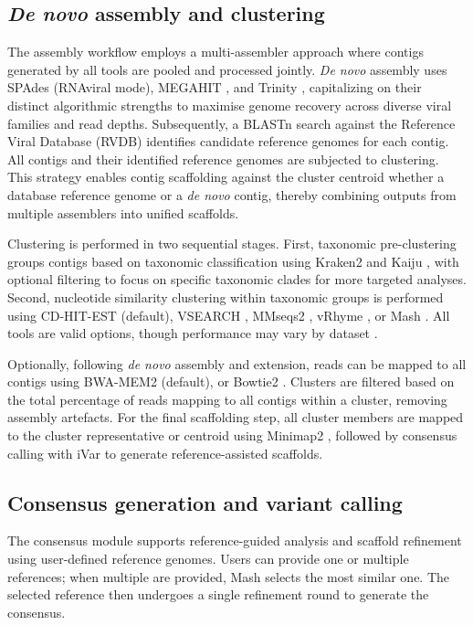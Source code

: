 \subsection{\textmd{\textit{De novo}} assembly and clustering}
The assembly workflow employs a multi-assembler approach where contigs generated by all tools are pooled and processed jointly. \textit{De novo} assembly uses SPAdes \citep{Meleshko2021-gb} (RNAviral mode), MEGAHIT \citep{Li2016-sd}, and Trinity \citep{Grabherr2011-ef}, capitalizing on their distinct algorithmic strengths to maximise genome recovery across diverse viral families and read depths. Subsequently, a BLASTn \citep{Altschul1990-sy} search against the Reference Viral Database (RVDB) \citep{Chin2025-fd} identifies candidate reference genomes for each contig. All contigs and their identified reference genomes are subjected to clustering. This strategy enables contig scaffolding against the cluster centroid whether a database reference genome or a \textit{de novo} contig, thereby combining outputs from multiple assemblers into unified scaffolds.

Clustering is performed in two sequential stages. First, taxonomic pre-clustering groups contigs based on taxonomic classification using Kraken2 \citep{Wood2019-jl} and Kaiju \citep{Menzel2016-tz}, with optional filtering to focus on specific taxonomic clades for more targeted analyses. Second, nucleotide similarity clustering within taxonomic groups is performed using CD-HIT-EST \citep{Li2006-nj} (default), VSEARCH \citep{Rognes2016-ju}, MMseqs2 \citep{Steinegger2017-ci}, vRhyme \citep{Kieft2022-km}, or Mash \citep{Ondov2019-bo}. All tools are valid options, though performance may vary by dataset \citep{Zielezinski2025-vl,Steinegger2017-ci}.

Optionally, following \textit{de novo} assembly and extension, reads can be mapped to all contigs using BWA-MEM2 \citep{Vasimuddin2019-rb} (default), or Bowtie2 \citep{Langmead2019-wx}. Clusters are filtered based on the total percentage of reads mapping to all contigs within a cluster, removing assembly artefacts. For the final scaffolding step, all cluster members are mapped to the cluster representative or centroid using Minimap2 \citep{Li2018-gi}, followed by consensus calling with iVar \citep{Grubaugh2019-xd} to generate reference-assisted scaffolds.

\subsection{Consensus generation and variant calling}
The consensus module supports reference-guided analysis and scaffold refinement using user-defined reference genomes. Users can provide one or multiple references; when multiple are provided, Mash \citep{Ondov2019-bo} selects the most similar one. The selected reference then undergoes a single refinement round to generate the consensus.

